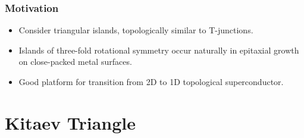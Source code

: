 \documentclass[xcolor=dvipsnames,10pt,aspectratio=169]{beamer}
\newcommand{\MO}{Motivation}
\newcommand{\KT}{Kitaev Triangle}
\begin{document}
  \begin{frame}
    \frametitle{\MO}
    \begin{multicols}{2}

    \begin{itemize}
      \item Consider triangular islands, topologically similar to T-junctions.
      \item Islands of three-fold rotational symmetry occur naturally in epitaxial growth on close-packed metal surfaces.
      \item Good platform for transition from 2D to 1D topological superconductor.
    \end{itemize}
    \newline

    \begin{figure}
      \end{figure}
    \end{multicols}

  \end{frame}


  \section{\KT}
\end{document}
